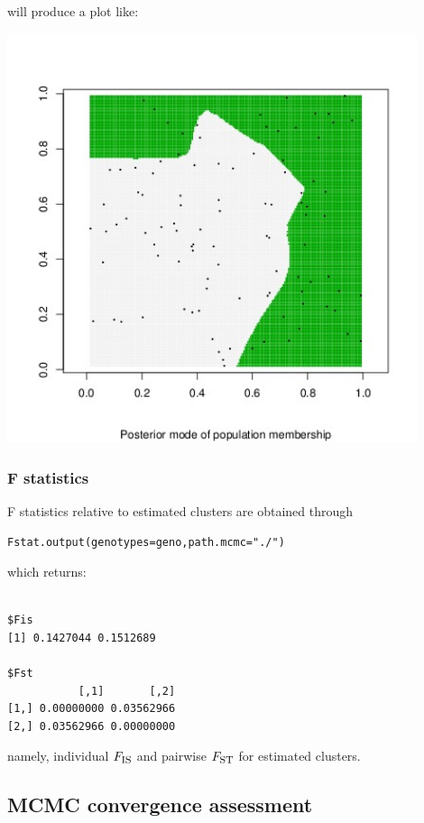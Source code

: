\documentclass{article}
\newcommand{\Fst}{F_{\mbox{\footnotesize ST}}}
\newcommand{\Fis}{F_{\mbox{\footnotesize IS}}}
\begin{document}
will produce a plot like:

\includegraphics[width=12cm]{../inst/images/map.jpeg}

\subsubsection{F statistics}
F statistics relative to estimated clusters are obtained through

\begin{verbatim}
Fstat.output(genotypes=geno,path.mcmc="./")
\end{verbatim}



which returns:

\begin{verbatim}

$Fis
[1] 0.1427044 0.1512689

$Fst
           [,1]       [,2]
[1,] 0.00000000 0.03562966
[2,] 0.03562966 0.00000000
\end{verbatim}



namely, individual  $\Fis$ and pairwise $\Fst$ for estimated clusters.



\subsection{MCMC convergence assessment}
\end{document}
